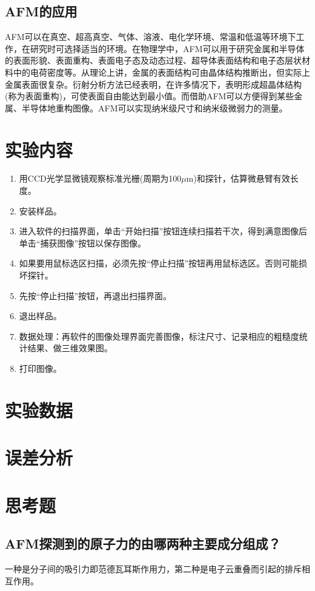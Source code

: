 \documentclass[a4paper]{article}
\begin{document}
\subsection{AFM的应用}
AFM可以在真空、超高真空、气体、溶液、电化学环境、常温和低温等环境下工作，在研究时可选择适当的环境。在物理学中，AFM可以用于研究金属和半导体的表面形貌、表面重构、表面电子态及动态过程、超导体表面结构和电子态层状材料中的电荷密度等。从理论上讲，金属的表面结构可由晶体结构推断出，但实际上金属表面很复杂。衍射分析方法已经表明，在许多情况下，表明形成超晶体结构(称为表面重构)，可使表面自由能达到最小值。而借助AFM可以方便得到某些金属、半导体地重构图像。AFM可以实现纳米级尺寸和纳米级微弱力的测量。

\section{实验内容}
\begin{enumerate}
\item 用CCD光学显微镜观察标准光栅(周期为100$\mu$m)和探针，估算微悬臂有效长度。
\item 安装样品。
\item 进入软件的扫描界面，单击“开始扫描”按钮连续扫描若干次，得到满意图像后单击“捕获图像”按钮以保存图像。
\item 如果要用鼠标选区扫描，必须先按“停止扫描”按钮再用鼠标选区。否则可能损坏探针。
\item 先按“停止扫描”按钮，再退出扫描界面。
\item 退出样品。
\item 数据处理：再软件的图像处理界面完善图像，标注尺寸、记录相应的粗糙度统计结果、做三维效果图。
\item 打印图像。
\end{enumerate}

\section{实验数据}

\section{误差分析}

\section{思考题}
\subsection{AFM探测到的原子力的由哪两种主要成分组成？}
一种是分子间的吸引力即范德瓦耳斯作用力，第二种是电子云重叠而引起的排斥相互作用。
\end{document}
